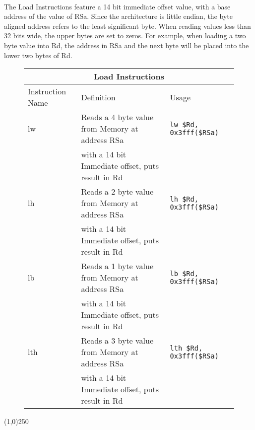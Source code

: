 \documentclass[letterpaper, 11pt]{article}
\begin{document}
\paragraph{} The Load Instructions feature a 14 bit immediate offset value, with a base address of the value of RSa. Since the architecture is little endian,
the byte aligned address refers to the least significant byte. When reading values less than 32 bits wide, the upper bytes are set to zeros. For example, when loading
a two byte value into Rd, the address in RSa and the next byte will be placed into the lower two bytes of Rd.
\begin{figure}[!h]
	\begin{center}
		\begin{tabular}{|l|l|l|}
			\hline
			\multicolumn{3}{c}{Load Instructions} \\ \hline
			Instruction Name	& Definition											& Usage 							\\ \hline
			lw					& Reads a 4 byte value from Memory at address RSa 		& \texttt{lw \$Rd, 0x3fff(\$RSa)}	\\ 
			\hfill				& with a 14 bit Immediate offset, puts result in Rd		& \hfill 							\\ \hline
			lh					& Reads a 2 byte value from Memory at address RSa 		& \texttt{lh \$Rd, 0x3fff(\$RSa)}	\\ 
			\hfill				& with a 14 bit Immediate offset, puts result in Rd		& \hfill 							\\ \hline			
			lb					& Reads a 1 byte value from Memory at address RSa 		& \texttt{lb \$Rd, 0x3fff(\$RSa)}	\\ 
			\hfill				& with a 14 bit Immediate offset, puts result in Rd		& \hfill 							\\ \hline			
			lth					& Reads a 3 byte value from Memory at address RSa 		& \texttt{lth \$Rd, 0x3fff(\$RSa)}	\\ 
			\hfill				& with a 14 bit Immediate offset, puts result in Rd		& \hfill 							\\ \hline			
		
		\end{tabular} 
	\end{center}
	
\end{figure}

\begin{center}
	\line(1,0){250}
\end{center}
\end{document}
